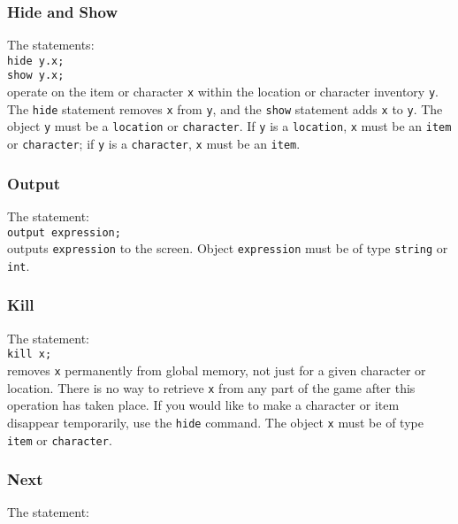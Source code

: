 \documentclass[12pt]{article}
\begin{document}
\subsubsection{Hide and Show}
The statements:\\

\texttt{hide y.x;} \\
\indent \texttt{show y.x;} \\

\noindent operate on the item or character \texttt{x} within the location or character inventory \texttt{y}.  The \texttt{hide} statement removes \texttt{x} from \texttt{y}, and the \texttt{show} statement adds \texttt{x} to \texttt{y}.  The object \texttt{y} must be a \texttt{location} or \texttt{character}.  If \texttt{y} is a \texttt{location}, \texttt{x} must be an \texttt{item} or \texttt{character}; if \texttt{y} is a \texttt{character}, \texttt{x} must be an \texttt{item}.

\subsubsection{Output}
The statement: \\

\texttt{output expression;} \\

\noindent outputs \texttt{expression} to the screen.  Object \texttt{expression} must be of type \texttt{string} or \texttt{int}.

\subsubsection{Kill}
The statement: \\

\texttt{kill x;} \\

\noindent removes \texttt{x} permanently from global memory, not just for a given character or location.  There is no way to retrieve \texttt{x} from any part of the game after this operation has taken place.  If you would like to make a character or item disappear temporarily, use the \texttt{hide} command.  The object  \texttt{x} must be of type \texttt{item} or \texttt{character}.

\subsubsection{Next}
The statement: \\
\end{document}
